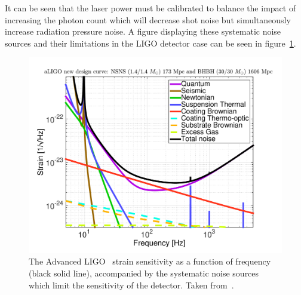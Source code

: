It can be seen that the laser power must be calibrated to balance the impact of increasing the photon count which will decrease shot noise but simultaneously increase radiation pressure noise. A figure displaying these systematic noise sources and their limitations in the LIGO detector case can be seen in figure~\ref{3:fig:aLIGO_noise}.
%
\begin{figure}
    \centering
    \includegraphics[width=0.75\linewidth]{images/3_detector_characterisation/aLIGO_newDesign.pdf}
    \caption{The Advanced LIGO~\cite{aLIGO:2015} strain sensitivity as a function of frequency (black solid line), accompanied by the systematic noise sources which limit the sensitivity of the detector. Taken from~\cite{aLIGO_design_curve:2018}.}
    \label{3:fig:aLIGO_noise}
\end{figure}
%

